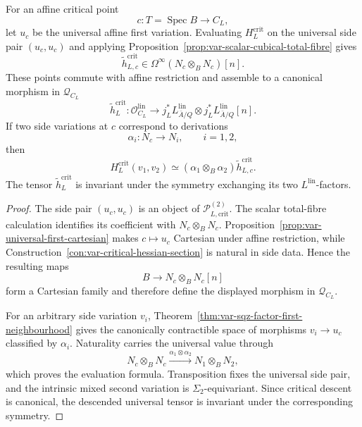 \begin{proposition}
\label{prop:var-critical-hessian-tensor}
For an affine critical point
\[
    c:T=\operatorname{Spec}B\longrightarrow C_L,
\]
let \(u_c\) be the universal affine first variation.  Evaluating \(H_L^{\mathrm{crit}}\) on the universal side pair \((u_c,u_c)\) and applying Proposition~\ref{prop:var-scalar-cubical-total-fibre} gives
\[
    \widetilde h_{L,c}^{\mathrm{crit}}
    \in
    \Omega^\infty(N_c\otimes_BN_c)[n].
\]
These points commute with affine restriction and assemble to a canonical morphism in \(\mathcal Q_{C_L}\)
\[
    \boxed{
    \widetilde h_L^{\mathrm{crit}}:
    \mathcal O_{C_L}^{\mathrm{lin}}
    \longrightarrow
    j_L^*L^{\mathrm{lin}}_{\bar A/Q}
    \otimes
    j_L^*L^{\mathrm{lin}}_{\bar A/Q}[n].
    }
\]
If two side variations at \(c\) correspond to derivations
\[
    \alpha_i:N_c\longrightarrow N_i,
    \qquad i=1,2,
\]
then
\[
    \boxed{
    H_L^{\mathrm{crit}}(v_1,v_2)
    \simeq
    (\alpha_1\otimes_B\alpha_2)
    \widetilde h_{L,c}^{\mathrm{crit}}.
    }
\]
The tensor \(\widetilde h_L^{\mathrm{crit}}\) is invariant under the symmetry exchanging its two \(L^{\mathrm{lin}}\)-factors.
\end{proposition}

\begin{proof}
The side pair \((u_c,u_c)\) is an object of \(\mathcal P^{(2)}_{L,\mathrm{crit}}\).  The scalar total-fibre calculation identifies its coefficient with \(N_c\otimes_BN_c\).  Proposition~\ref{prop:var-universal-first-cartesian} makes \(c\mapsto u_c\) Cartesian under affine restriction, while Construction~\ref{con:var-critical-hessian-section} is natural in side data.  Hence the resulting maps
\[
    B\longrightarrow N_c\otimes_BN_c[n]
\]
form a Cartesian family and therefore define the displayed morphism in \(\mathcal Q_{C_L}\).

For an arbitrary side variation \(v_i\), Theorem~\ref{thm:var-sqz-factor-first-neighbourhood} gives the canonically contractible space of morphisms \(v_i\to u_c\) classified by \(\alpha_i\).  Naturality carries the universal value through
\[
    N_c\otimes_BN_c
    \xrightarrow{\alpha_1\otimes\alpha_2}
    N_1\otimes_BN_2,
\]
which proves the evaluation formula.  Transposition fixes the universal side pair, and the intrinsic mixed second variation is \(\Sigma_2\)-equivariant.  Since critical descent is canonical, the descended universal tensor is invariant under the corresponding symmetry.
\end{proof}

